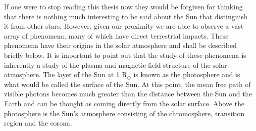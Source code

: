 If one were to stop reading this thesis now they would be forgiven for thinking that there is nothing much interesting to be said about the Sun that distinguish it from other stars. However, given our proximity we are able to observe a vast array of phenomena, many of which have direct terrestrial impacts. These phenomena have their origins in the solar atmosphere and shall be described briefly below. It is important to point out that the study of these phenomena is inherently a study of the plasma and magnetic field structure of the solar atmosphere.
The layer of the Sun at 1 R$_{\odot}$ is known as the photosphere and is what would be called the surface of the Sun. At this point, the mean free path of visible photons becomes much greater than the distance between the Sun and the Earth and can be thought as coming directly from the solar surface.
Above the photosphere is the Sun's atmosphere consisting of the chromosphere, transition region and the corona. 
